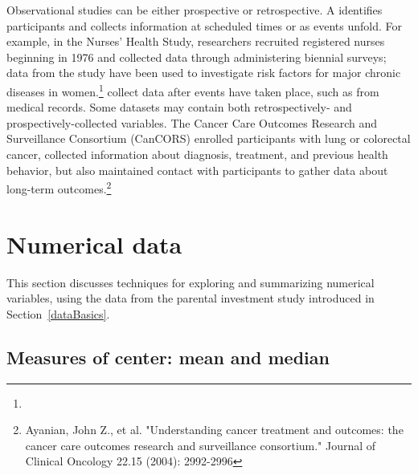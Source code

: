Observational studies can be either prospective or retrospective. A  identifies participants and collects information at scheduled times or as events unfold. For example, in the Nurses' Health Study, researchers recruited registered nurses beginning in 1976 and collected data through administering biennial surveys; data from the study have been used to investigate risk factors for major chronic diseases in women.\footnote{\texttt{}}  collect data after events have taken place, such as from medical records. Some datasets may contain both retrospectively- and prospectively-collected variables. The Cancer Care Outcomes Research and Surveillance Consortium (CanCORS) enrolled participants with lung or colorectal cancer, collected information about diagnosis, treatment, and previous health behavior, but also maintained contact with participants to gather data about long-term outcomes.\footnote{Ayanian, John Z., et al. "Understanding cancer treatment and outcomes: the cancer care outcomes research and surveillance consortium." Journal of Clinical Oncology 22.15 (2004): 2992-2996}  


\section[Numerical data]{Numerical data}
\label{numericalData}


This section discusses techniques for exploring and summarizing numerical variables, using the  data from the parental investment study introduced in Section~\ref{dataBasics}.

\subsection{Measures of center: mean and median}
\label{measuresOfCenter}

